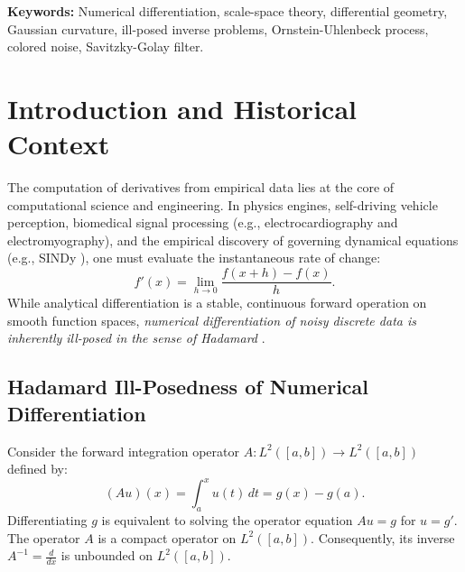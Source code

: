 \documentclass[11pt,a4paper]{article}
\theoremstyle{definition}
\begin{document}
\noindent\textbf{Keywords:} Numerical differentiation, scale-space theory, differential geometry, Gaussian curvature, ill-posed inverse problems, Ornstein-Uhlenbeck process, colored noise, Savitzky-Golay filter.

\tableofcontents
\newpage


\section{Introduction and Historical Context}
\label{sec:intro}

The computation of derivatives from empirical data lies at the core of computational science and engineering. In physics engines, self-driving vehicle perception, biomedical signal processing (e.g., electrocardiography and electromyography), and the empirical discovery of governing dynamical equations (e.g., SINDy \cite{brunton2016}), one must evaluate the instantaneous rate of change:
\begin{equation}
f'(x) = \lim_{h \to 0} \frac{f(x+h) - f(x)}{h}.
\label{eq:hadamard_diff}
\end{equation}
While analytical differentiation is a stable, continuous forward operation on smooth function spaces, \emph{numerical differentiation of noisy discrete data is inherently ill-posed in the sense of Hadamard} \cite{groetsch1993, hanke2001}. 

\subsection{Hadamard Ill-Posedness of Numerical Differentiation}
Consider the forward integration operator $A: L^2([a, b]) \to L^2([a, b])$ defined by:
\begin{equation}
(A u)(x) = \int_a^x u(t) \, dt = g(x) - g(a).
\end{equation}
Differentiating $g$ is equivalent to solving the operator equation $A u = g$ for $u = g'$. The operator $A$ is a compact operator on $L^2([a, b])$. Consequently, its inverse $A^{-1} = \frac{d}{dx}$ is unbounded on $L^2([a, b])$. 
\end{document}
